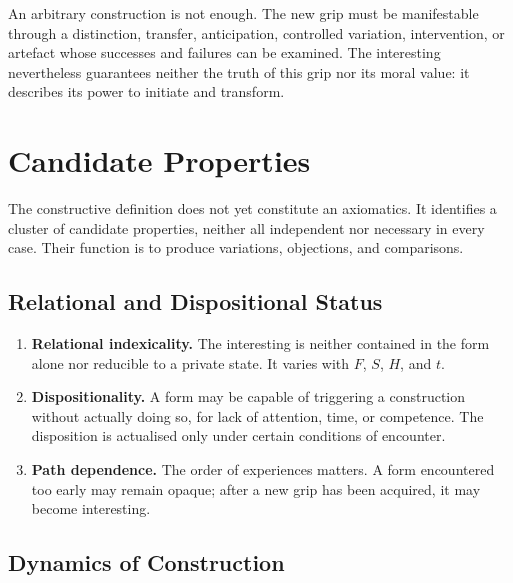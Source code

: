 \documentclass[11pt,a4paper]{article}
\begin{document}
An arbitrary construction is not enough. The new grip must be manifestable
through a distinction, transfer, anticipation, controlled variation,
intervention, or artefact whose successes and failures can be examined. The
interesting nevertheless guarantees neither the truth of this grip nor its
moral value: it describes its power to initiate and transform.

\section{Candidate Properties}

The constructive definition does not yet constitute an axiomatics. It identifies
a cluster of candidate properties, neither all independent nor necessary in
every case. Their function is to produce variations, objections, and
comparisons.

\subsection{Relational and Dispositional Status}

\begin{enumerate}
  \item \textbf{Relational indexicality.} The interesting is neither contained
        in the form alone nor reducible to a private state. It varies with
        \(F\), \(S\), \(H\), and \(t\).
  \item \textbf{Dispositionality.} A form may be capable of triggering a
        construction without actually doing so, for lack of attention, time, or
        competence. The disposition is actualised only under certain conditions
        of encounter.
  \item \textbf{Path dependence.} The order of experiences matters. A form
        encountered too early may remain opaque; after a new grip has been
        acquired, it may become interesting.
\end{enumerate}

\subsection{Dynamics of Construction}
\end{document}
